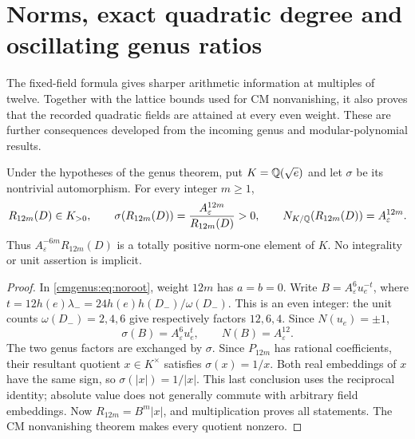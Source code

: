 \section{Norms, exact quadratic degree and oscillating genus ratios}
\label{cmextend:sec:extensions}
The fixed-field formula gives sharper arithmetic information at multiples
of twelve. Together with the lattice bounds used for CM nonvanishing, it
also proves that the recorded quadratic fields are attained at every even
weight. These are further consequences developed from the incoming genus
and modular-polynomial results.

\begin{theorem}
\label{cmextend:thm:norm12}
Under the hypotheses of the genus theorem, put $K=\mathbb{Q}(\sqrt e)$ and let
$\sigma$ be its nontrivial automorphism. For every integer $m\ge1$,
\[
 R_{12m}(D)\in K_{>0},\qquad
 \sigma(R_{12m}(D))=\frac{A_\varepsilon^{12m}}{R_{12m}(D)}>0,
 \qquad N_{K/\mathbb{Q}}(R_{12m}(D))=A_\varepsilon^{12m}.
\]
Thus $A_\varepsilon^{-6m}R_{12m}(D)$ is a totally positive norm-one
element of $K$. No integrality or unit assertion is implicit.
\end{theorem}
\begin{proof}
In \eqref{cmgenus:eq:noroot}, weight $12m$ has $a=b=0$. Write
$B=A_\varepsilon^6u_e^{-t}$, where
$t=12h(e)\lambda_-=24h(e)h(D_-)/\omega(D_-)$.
This is an even integer: the unit counts $\omega(D_-)=2,4,6$ give
respectively factors $12,6,4$. Since $N(u_e)=\pm1$,
\[
 \sigma(B)=A_\varepsilon^6u_e^t,\qquad N(B)=A_\varepsilon^{12}.
\]
The two genus factors are exchanged by $\sigma$. Since $P_{12m}$ has
rational coefficients, their resultant quotient $x\in K^\times$ satisfies
$\sigma(x)=1/x$. Both real embeddings of $x$ have the same sign, so
$\sigma(|x|)=1/|x|$. This last conclusion uses the reciprocal identity;
absolute value does not generally commute with arbitrary field embeddings.
Now $R_{12m}=B^m|x|$, and multiplication proves all statements.
The CM nonvanishing theorem makes every quotient nonzero.
\end{proof}

